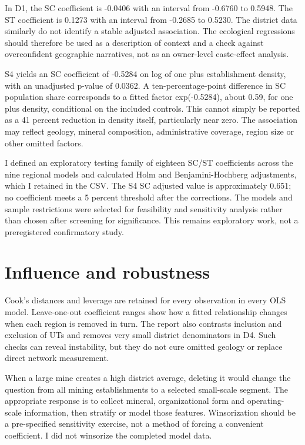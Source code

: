 \documentclass[11pt,a4paper]{report}
\begin{document}
In D1, the SC coefficient is -0.0406 with an interval from -0.6760 to 0.5948. The ST coefficient is 0.1273 with an interval from -0.2685 to 0.5230. The district data similarly do not identify a stable adjusted association. The ecological regressions should therefore be used as a description of context and a check against overconfident geographic narratives, not as an owner-level caste-effect analysis.

S4 yields an SC coefficient of -0.5284 on log of one plus establishment density, with an unadjusted p-value of 0.0362. A ten-percentage-point difference in SC population share corresponds to a fitted factor exp(-0.5284), about 0.59, for one plus density, conditional on the included controls. This cannot simply be reported as a 41 percent reduction in density itself, particularly near zero. The association may reflect geology, mineral composition, administrative coverage, region size or other omitted factors.

I defined an exploratory testing family of eighteen SC/\allowbreak{}ST coefficients across the nine regional models and calculated Holm and Benjamini-Hochberg adjustments, which I retained in the CSV. The S4 SC adjusted value is approximately 0.651; no coefficient meets a 5 percent threshold after the corrections. The models and sample restrictions were selected for feasibility and sensitivity analysis rather than chosen after screening for significance. This remains exploratory work, not a preregistered confirmatory study.

\section{Influence and robustness}
Cook's distances and leverage are retained for every observation in every OLS model. Leave-one-out coefficient ranges show how a fitted relationship changes when each region is removed in turn. The report also contrasts inclusion and exclusion of UTs and removes very small district denominators in D4. Such checks can reveal instability, but they do not cure omitted geology or replace direct network measurement.

When a large mine creates a high district average, deleting it would change the question from all mining establishments to a selected small-scale segment. The appropriate response is to collect mineral, organizational form and operating-scale information, then stratify or model those features. Winsorization should be a pre-specified sensitivity exercise, not a method of forcing a convenient coefficient. I did not winsorize the completed model data.
\end{document}
